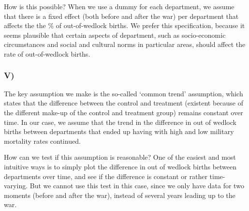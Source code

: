 \documentclass[
]{article}
\begin{document}
How is this possible? When we use a dummy for each department, we assume
that there is a fixed effect (both before and after the war) per
department that affects the the \% of out-of-wedlock births. We prefer
this specification, because it seems plausible that certain aspects of
department, such as socio-economic circumstances and social and cultural
norms in particular areas, should affect the rate of out-of-wedlock
births.

\hypertarget{v}{%
\subsubsection{V)}\label{v}}

The key assumption we make is the so-called `common trend' assumption,
which states that the difference between the control and treatment
(existent because of the different make-up of the control and treatment
group) remains constant over time. In our case, we assume that the trend
in the difference in out of wedlock births between departments that
ended up having with high and low military mortality rates continued.

How can we test if this assumption is reasonable? One of the easiest and
most intuitive ways is to simply plot the difference in out of wedlock
births between departments over time, and see if the difference is
constant or rather time-varying. But we cannot use this test in this
case, since we only have data for two moments (before and after the
war), instead of several years leading up to the war.
\end{document}
